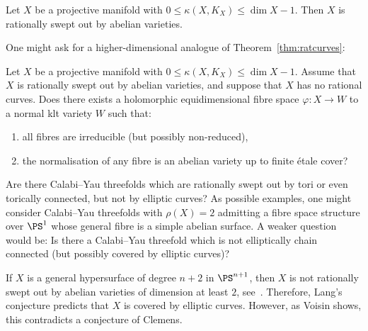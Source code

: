 \begin{conj}\label{conj:main7.5}
Let $X$ be a projective manifold with $0 \leq \kappa (X,K_X)\leq \dim X - 1$. Then $X$ is rationally swept out by abelian varieties.
\end{conj}

One might ask for a higher-dimensional analogue of Theorem~\ref{thm:ratcurves}:

\begin{problem}\label{prob:main7.6}
Let $X$ be a projective manifold with $0 \leq \kappa (X,K_X) \leq \dim X - 1$. Assume that $X$ is rationally swept out by abelian varieties, and suppose that $X$ has no rational curves. Does there exists a holomorphic equidimensional fibre space $\varphi\colon X \to W $ to a normal klt variety $W$ such that:
\begin{enumerate}\alphenumi
\item \label{list-7.6.1}all fibres are irreducible (but possibly non-reduced),
\item \label{list-7.6.2}the normalisation of any fibre is an abelian variety up to finite étale cover?
\end{enumerate}
\end{problem}

\begin{problem}\label{prob:main7.7}
Are there Calabi--Yau threefolds which are rationally swept out by tori or even torically connected, but not by elliptic curves? As possible examples, one might consider Calabi--Yau threefolds with $\rho(X) = 2$ admitting a fibre space structure over $\PS^1$ whose general fibre is a simple abelian surface. A weaker question would be: Is there a Calabi--Yau threefold which is not elliptically chain connected (but possibly covered by elliptic curves)?
\end{problem}

\begin{rema}\label{rema:main7.8}
If $X$ is a general hypersurface of degree $n+2$ in $\PS^{n+1}$, then $X$ is not rationally swept out by abelian varieties of dimension at least $2$, see~\cite[Theorem~3.30]{Voi03}. Therefore, Lang's conjecture predicts that $X$ is covered by elliptic curves. However, as Voisin shows, this contradicts a conjecture of Clemens.
\end{rema}


